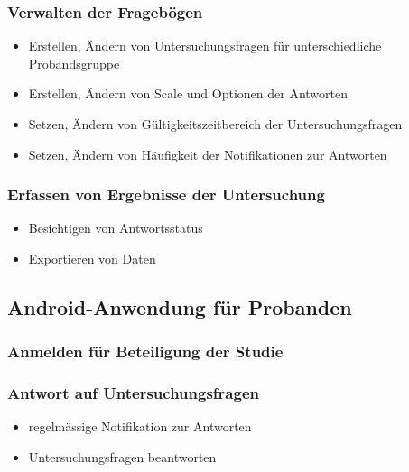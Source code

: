 \documentclass[a4paper]{scrreprt}
\begin{document}
                \subsubsection{Verwalten der Frageb\"ogen}
                    \begin{itemize}
                        \item Erstellen, \"Andern von Untersuchungsfragen f\"ur unterschiedliche Probandsgruppe
                        \item Erstellen, \"Andern von Scale und Optionen der Antworten
                        \item Setzen, \"Andern von G\"ultigkeitszeitbereich der Untersuchungsfragen
                        \item Setzen, \"Andern von H\"aufigkeit der Notifikationen zur Antworten
                    \end{itemize}

                \subsubsection{Erfassen von Ergebnisse der Untersuchung}
                    \begin{itemize}
                        \item Besichtigen von Antwortsstatus
                        \item Exportieren von Daten
                    \end{itemize}
            \vspace*{2cm}

            \subsection{Android-Anwendung f\"ur Probanden}
                \vspace*{0.2cm}

                \subsubsection{Anmelden f\"ur Beteiligung der Studie}

                \subsubsection{Antwort auf Untersuchungsfragen}
                    \begin{itemize}
                        \item regelm\"assige Notifikation zur Antworten
                        \item Untersuchungsfragen beantworten
                    \end{itemize}
\end{document}
